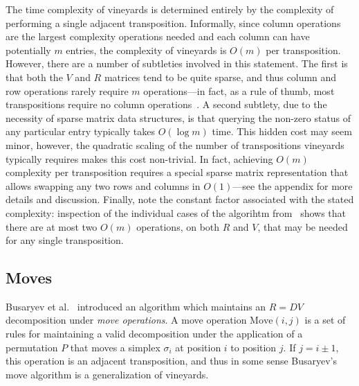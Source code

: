 \documentclass{siamart190516}
\begin{document}
 The time complexity of vineyards is determined entirely by the complexity of performing a single adjacent transposition.
 Informally, since column operations are the largest complexity operations needed and each column can have potentially $m$ entries, the complexity of vineyards is $O(m)$ per transposition. 
 However, there are a number of subtleties involved in this statement. 
 The first  is that both the $V$ and $R$ matrices tend to be quite sparse, and thus column and row operations rarely require $m$ operations---in fact, as a rule of thumb, most transpositions require no column operations~\cite{edelsbrunner2000topological}. A second subtlety, due to the necessity of sparse matrix data structures, is that querying the non-zero status of any particular entry typically takes $O(\log m)$ time. This hidden cost may seem minor, however, the quadratic scaling of the number of transpositions vineyards typically requires makes this cost non-trivial.   
In fact, achieving $O(m)$ complexity per transposition requires a special sparse matrix representation that allows swapping any two rows and columns in $O(1)$---see the appendix for more details and discussion. Finally, note the constant factor associated with the stated complexity: inspection of the individual cases of the algorihtm from~\cite{cohen2006vines} shows that there are at most two $O(m)$ operations, on both $R$ and $V$, that may be needed for any single transposition.
 

\subsection{Moves}\label{sec:moves} Busaryev et al.~\cite{busaryev2010tracking} introduced an algorithm which maintains an $R = D V$ decomposition under \emph{move operations}. A move operation $\mathrm{Move}(i,j)$ is a set of rules for maintaining a valid decomposition under the application of a permutation $P$ that moves a simplex $\sigma_i$ at position $i$ to position $j$. If $j = i \pm 1$, this operation is an adjacent transposition, and thus in some sense Busaryev's move algorithm is a generalization of  vineyards.
\end{document}
